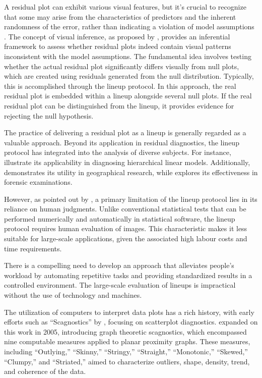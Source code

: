 \documentclass[]{interact}
\theoremstyle{plain}%
\theoremstyle{definition}
\theoremstyle{remark}
\begin{document}
A residual plot can exhibit various visual features, but it's crucial to
recognize that some may arise from the characteristics of predictors and
the inherent randomness of the error, rather than indicating a violation
of model assumptions \citep{li2023plot}. The concept of visual
inference, as proposed by \citet{buja2009statistical}, provides an
inferential framework to assess whether residual plots indeed contain
visual patterns inconsistent with the model assumptions. The fundamental
idea involves testing whether the actual residual plot significantly
differs visually from null plots, which are created using residuals
generated from the null distribution. Typically, this is accomplished
through the lineup protocol. In this approach, the real residual plot is
embedded within a lineup alongside several null plots. If the real
residual plot can be distinguished from the lineup, it provides evidence
for rejecting the null hypothesis.

The practice of delivering a residual plot as a lineup is generally
regarded as a valuable approach. Beyond its application in residual
diagnostics, the lineup protocol has integrated into the analysis of
diverse subjects. For instance,
\cite{loy2013diagnostic, loy2014hlmdiag, loy2015you} illustrate its
applicability in diagnosing hierarchical linear models. Additionally,
\citet{widen2016graphical} demonstrates its utility in geographical
research, while \citet{krishnan2021hierarchical} explores its
effectiveness in forensic examinations.

However, as pointed out by \citet{li2023plot}, a primary limitation of
the lineup protocol lies in its reliance on human judgments. Unlike
conventional statistical tests that can be performed numerically and
automatically in statistical software, the lineup protocol requires
human evaluation of images. This characteristic makes it less suitable
for large-scale applications, given the associated high labour costs and
time requirements.

There is a compelling need to develop an approach that alleviates
people's workload by automating repetitive tasks and providing
standardized results in a controlled environment. The large-scale
evaluation of lineups is impractical without the use of technology and
machines.

The utilization of computers to interpret data plots has a rich history,
with early efforts such as ``Scagnostics'' by \citet{tukey1985computer},
focusing on scatterplot diagnostics. \citet{wilkinson2005graph} expanded
on this work in 2005, introducing graph theoretic scagnostics, which
encompassed nine computable measures applied to planar proximity graphs.
These measures, including ``Outlying,'' ``Skinny,'' ``Stringy,''
``Straight,'' ``Monotonic,'' ``Skewed,'' ``Clumpy,'' and ``Striated,''
aimed to characterize outliers, shape, density, trend, and coherence of
the data.
\end{document}
